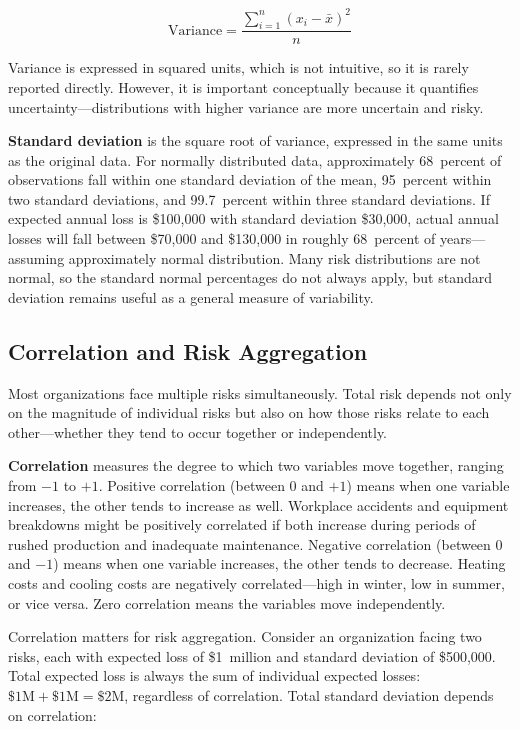 \documentclass[11pt,openany]{book}
\begin{document}
\[
  \text{Variance} = \frac{\sum_{i=1}^{n}(x_i - \bar{x})^2}{n}
\]

Variance is expressed in squared units, which is not intuitive, so it is rarely
reported directly. However, it is important conceptually because it quantifies
uncertainty---distributions with higher variance are more uncertain and risky.

\textbf{Standard deviation} is the square root of variance, expressed in the
same units as the original data. For normally distributed data, approximately
68~percent of observations fall within one standard deviation of the mean,
95~percent within two standard deviations, and 99.7~percent within three
standard deviations. If expected annual loss is \$100,000 with standard
deviation \$30,000, actual annual losses will fall between \$70,000 and
\$130,000 in roughly 68~percent of years---assuming approximately normal
distribution. Many risk distributions are not normal, so the standard normal
percentages do not always apply, but standard deviation remains useful as a
general measure of variability.

\subsection{Correlation and Risk Aggregation}
\label{subsec:correlation}

Most organizations face multiple risks simultaneously. Total risk depends not
only on the magnitude of individual risks but also on how those risks relate to
each other---whether they tend to occur together or independently.

\textbf{Correlation} measures the degree to which two variables move together,
ranging from \(-1\) to \(+1\). Positive correlation (between 0 and \(+1\))
means when one variable increases, the other tends to increase as well.
Workplace accidents and equipment breakdowns might be positively correlated if
both increase during periods of rushed production and inadequate maintenance.
Negative correlation (between 0 and \(-1\)) means when one variable increases,
the other tends to decrease. Heating costs and cooling costs are negatively
correlated---high in winter, low in summer, or vice versa. Zero correlation
means the variables move independently.

Correlation matters for risk aggregation. Consider an organization facing two
risks, each with expected loss of \$1~million and standard deviation of
\$500,000. Total expected loss is always the sum of individual expected losses:
\(\$1\text{M} + \$1\text{M} = \$2\text{M}\), regardless of correlation. Total
standard deviation depends on correlation:
\end{document}
